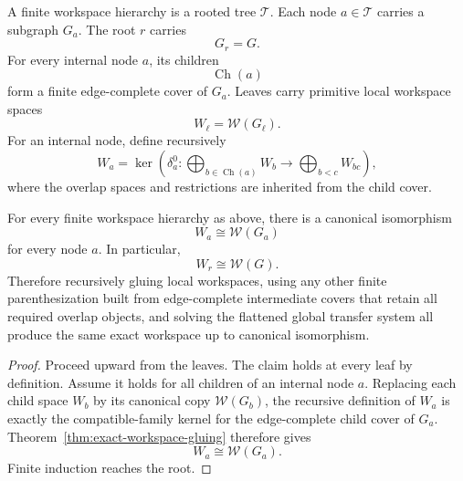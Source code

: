 

A finite workspace hierarchy is a rooted tree \(\mathcal T\). Each node
\(a\in\mathcal T\) carries a subgraph \(G_a\). The root \(r\) carries
\[
G_r=G.
\]
For every internal node \(a\), its children
\[
\operatorname{Ch}(a)
\]
form a finite edge-complete cover of \(G_a\). Leaves carry primitive local
workspace spaces
\[
W_\ell=\mathscr W(G_\ell).
\]
For an internal node, define recursively
\[
\boxed{
W_a
=
\ker
\left(
\delta_a^0:
\bigoplus_{b\in\operatorname{Ch}(a)}W_b
\longrightarrow
\bigoplus_{b<c}W_{bc}
\right),
}
\]
where the overlap spaces and restrictions are inherited from the child cover.

\begin{theorem}\label{thm:hierarchical-collapse}
For every finite workspace hierarchy as above, there is a canonical
isomorphism
\[
\boxed{
W_a\cong\mathscr W(G_a)
}
\]
for every node \(a\). In particular,
\[
\boxed{
W_r\cong\mathscr W(G).
}
\]
Therefore recursively gluing local workspaces, using any other finite
parenthesization built from edge-complete intermediate covers that retain all
required overlap objects, and solving the flattened global transfer system all
produce the same exact workspace up to canonical isomorphism.
\end{theorem}

\begin{proof}
Proceed upward from the leaves. The claim holds at every leaf by definition.
Assume it holds for all children of an internal node \(a\). Replacing each
child space \(W_b\) by its canonical copy \(\mathscr W(G_b)\), the recursive
definition of \(W_a\) is exactly the compatible-family kernel for the
edge-complete child cover of \(G_a\). Theorem~\ref{thm:exact-workspace-gluing}
therefore gives
\[
W_a\cong\mathscr W(G_a).
\]
Finite induction reaches the root.
\end{proof}


